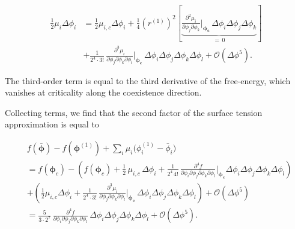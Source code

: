 \documentclass[12pt]{article}
\begin{document}
\begin{equation}
    \begin{aligned}
   \frac{1}{2}\mu_i\Delta \phi_i
   &=\frac{1}{2}\mu_{i,c}\Delta \phi_i
    + \frac{1}{4}
    \left(r^{(1)}\right)^2
    \left[
        \underbrace{\frac{\partial^2 \mu_i}{\partial \phi_j \partial \phi_k}\bigg\rvert_{\boldsymbol{\phi_c}}
        \,\Delta \phi_i\Delta \phi_j \Delta \phi_k }_{=\,0}
    \right]\\
    &+ \frac{1}{2^4 \cdot 3!}\,
     \frac{\partial^3 \mu_i}{ \partial \phi_j \partial \phi_k \partial \phi_l}\bigg\rvert_{\boldsymbol{\phi_c}}\,
     \Delta \phi_i
     \Delta \phi_j \Delta \phi_k \Delta \phi_l
   + \mathcal{O}(\Delta \phi^5).
    \end{aligned}
\end{equation}

The third-order term is equal to the third derivative of the free-energy, which vanishes at criticality along the coexistence direction.

Collecting terms, we find that the second factor of the surface tension approximation is equal to

\begin{equation} 
    \begin{aligned}
       &f(\bar{\boldsymbol{\phi}}) - f(\boldsymbol{\phi}^{(1)})
    +\sum_i \mu_i \bigl(\phi_i^{(1)} - \bar{\phi}_i\bigr)\\
    &=f(\boldsymbol{\phi}_c)-
    \left(
        f(\boldsymbol{\phi}_c)
        + \frac{1}{2}\,\mu_{i,c}\,\Delta \phi_i
        + \frac{1}{2^4\,4!}\,
        \frac{\partial^4 f}{\partial \phi_i \partial \phi_j \partial \phi_k \partial \phi_l}\bigg\rvert_{\boldsymbol{\phi_c}}
        \Delta \phi_i \Delta \phi_j \Delta \phi_k \Delta \phi_l
    \right)\\
    &+\left(
        \frac{1}{2}\mu_{i,c}\Delta \phi_i
        + \frac{1}{2^4 \cdot 3!}\,
        \frac{\partial^3 \mu_i}{ \partial \phi_j \partial \phi_k \partial \phi_l}\bigg\rvert_{\boldsymbol{\phi_c}}\,
        \Delta \phi_i
        \Delta \phi_j \Delta \phi_k \Delta \phi_l
    \right)
     + \mathcal{O}(\Delta \phi^5) \\
    &= \frac{5}{3\cdot2^7}\,
       \frac{\partial^4 f}{\partial \phi_i \partial \phi_j \partial \phi_k \partial \phi_l}\,
       \Delta \phi_i \Delta \phi_j \Delta \phi_k \Delta \phi_l
     + \mathcal{O}(\Delta \phi^5).\\
    \end{aligned}
\end{equation}
\end{document}
